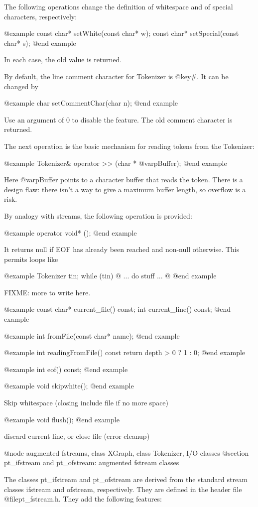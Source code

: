 The following operations change the definition of whitespace and of
special characters, respectively:

@example
const char* setWhite(const char* w);
const char* setSpecial(const char* s);
@end example

In each case, the old value is returned.

By default, the line comment character for Tokenizer is @key{#}.
It can be changed by

@example
char setCommentChar(char n);
@end example

Use an argument of 0 to disable the feature.  The old comment character
is returned.

The next operation is the basic mechanism for reading tokens from
the Tokenizer:

@example
Tokenizer& operator >> (char * @var{pBuffer});
@end example

Here @var{pBuffer} points to a character buffer that reads the token.
There is a design flaw: there isn't a way to give a maximum buffer
length, so overflow is a risk.

By analogy with streams, the following operation is provided:

@example
operator void* ();
@end example

It returns null if EOF has already been reached and non-null otherwise.
This permits loops like

@example
Tokenizer tin;
while (tin) @{ ... do stuff ... }@
@end example

FIXME: more to write here.

@example
const char* current_file() const;
int current_line() const;
@end example

@example
int fromFile(const char* name);
@end example

@example
int readingFromFile() const { return depth > 0 ? 1 : 0;}
@end example

@example
int eof() const;
@end example

@example
void skipwhite();
@end example

Skip whitespace (closing include file if no more space)

@example
void flush();
@end example

discard current line, or close file (error cleanup)

@node augmented fstreams, class XGraph, class Tokenizer, I/O classes
@section pt_ifstream and pt_ofstream: augmented fstream classes

The classes pt_ifstream and pt_ofstream are derived from the standard
stream classes ifstream and ofstream, respectively.  They are defined
in the header file @file{pt_fstream.h}.  They add the
following features:


